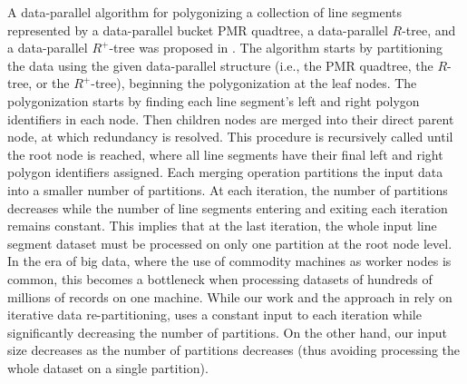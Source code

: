 A data-parallel algorithm for polygonizing a collection of line segments represented by a data-parallel bucket PMR quadtree, a data-parallel $R$-tree, and a 
data-parallel $R^+$-tree was proposed in \cite{hoel_data-parallel_2003}. 
The algorithm starts by partitioning the data using the given data-parallel structure (i.e., the PMR quadtree, the $R$-tree, or the $R^+$-tree), beginning the polygonization at the leaf nodes. 
The polygonization starts by finding each line segment's left and right polygon identifiers in each node. Then children nodes are merged into their direct parent node, at which redundancy is resolved. This procedure is recursively called until the root node is reached, where all line segments have their final left and right polygon identifiers assigned. 
Each merging operation partitions the input data into a smaller number of partitions. At each iteration, the number of partitions decreases while the number of line segments entering and exiting each iteration remains constant.
This implies that at the last iteration, the whole input line segment dataset must be processed on only one partition at the root node level.
In the era of big data, where the use of commodity machines as worker nodes is common, this becomes a bottleneck when processing datasets of hundreds of millions of records on one machine.
While our work and the approach in \cite{hoel_data-parallel_2003} rely on iterative data re-partitioning, \cite{hoel_data-parallel_2003} uses a constant input 
to each iteration while significantly decreasing the number of partitions.
On the other hand, our input size decreases as the number of partitions decreases (thus avoiding processing the whole dataset on a single partition).
